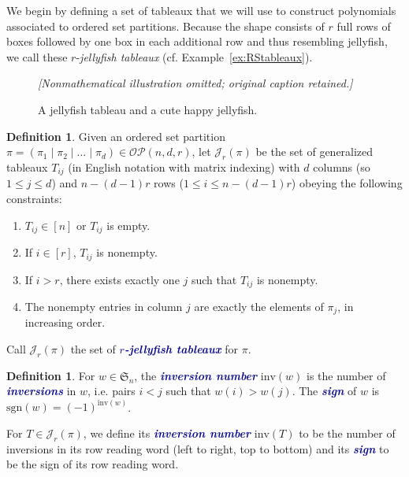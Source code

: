 \documentclass[10pt]{amsart}
\theoremstyle{definition}
\newtheorem{definition}[cdrthm]{Definition}
\theoremstyle{plain}
\theoremstyle{plain}
\theoremstyle{definition}
\theoremstyle{remark}
\theoremstyle{plain}
\theoremstyle{plain}
\theoremstyle{plain}
\numberwithin{equation}{section}
\newcommand{\rstab}{\mathcal{J}}
\newcommand{\inv}{\mathrm{inv}}
\newcommand{\sgn}{\mathrm{sgn}}
\newcommand{\ordsetpart}{\mathcal{OP}}
\newcommand{\newword}[1]{\textcolor{darkblue}{\textbf{\emph{#1}}}}
\begin{document}
We begin by defining a set of tableaux that we will use to construct polynomials associated to ordered set partitions. Because the shape consists of $r$ full rows of boxes followed by one box in each additional row and thus resembling jellyfish, we call these $r$-\emph{jellyfish tableaux} (cf. Example~\ref{ex:RStableaux}).

\begin{figure}[ht]
\hspace{.65in}
\textit{[Nonmathematical illustration omitted; original caption retained.]}
\caption{A jellyfish tableau and a cute happy jellyfish.}\label{fig:cute_jellyfish}
\end{figure}

\begin{definition}
\label{def:rstab}
Given an ordered set partition $\pi=(\pi_1\mid \pi_2\mid \ldots\mid \pi_d)\in\ordsetpart(n,d,r)$, let $\rstab_r(\pi)$ be the set of generalized tableaux $T_{ij}$ (in English notation with matrix indexing) with $d$ columns (so $1\leq j\leq d$) and $n-(d-1)r$ rows ($1\leq i\leq n-(d-1)r$) obeying the following constraints:
\begin{enumerate}
\item $T_{ij}\in[n]$ or $T_{ij}$ is empty.
\item If $i\in[r]$, $T_{ij}$ is nonempty.
\item If $i>r$, there exists exactly one $j$ such that $T_{ij}$ is nonempty.
\item The nonempty entries in column $j$ are exactly the elements of $\pi_j$, in increasing order.
\end{enumerate}
Call $\rstab_r(\pi)$ the set of \newword{$r$-jellyfish tableaux} for $\pi$.
\end{definition}

\begin{definition}
\label{def:inv}
For $w \in \mathfrak{S}_n$, the \newword{inversion number} $\inv(w)$ is the number of \newword{inversions} in $w$, i.e. pairs $i<j$ such that $w(i) > w(j)$. The \newword{sign} of $w$ is $\sgn(w)=(-1)^{\inv(w)}$.

For $T\in \rstab_r(\pi)$, we define its \newword{inversion number} $\inv(T)$ to be the number of inversions in its row reading word (left to right, top to bottom) and its \newword{sign} to be the sign of its row reading word.
\end{definition}
\end{document}
